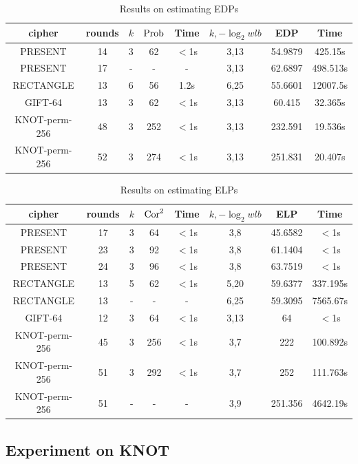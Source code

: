 \begin{table}
	\caption{Results on estimating EDPs}\label{tab:EDP}
	\centering
	\begin{tabular}{|c|c|c|c|c|c|c|c|}
		\hline
		cipher & rounds & $k$ & $\text{Prob}$ & Time & $k,-\log_2wlb$ & EDP & Time \\
		\hline
		PRESENT & 14 & 3 & 62 & $<$1s & 3,13 & 54.9879 & 425.15s \\
		\hline 
		PRESENT & 17 & - & - & - & 3,13 & 62.6897 & 498.513s\\
		\hline 
		RECTANGLE & 13 & 6 & 56 & 1.2s & 6,25 & 55.6601 & 12007.5s \\
		\hline
		GIFT-64 & 13 & 3 & 62 & $<$1s & 3,13 & 60.415 & 32.365s\\
		\hline
		KNOT-perm-256 & 48 & 3 & 252 & $<$1s & 3,13 & 232.591 & 19.536s\\
		\hline
		KNOT-perm-256 & 52 & 3 & 274 & $<$1s & 3,13 & 251.831 & 20.407s\\
		\hline
	\end{tabular}
\end{table}

\begin{table}
	\caption{Results on estimating ELPs}\label{tab:ELP}
	\centering
	\begin{tabular}{|c|c|c|c|c|c|c|c|}
		\hline
		cipher & rounds & $k$ & $\text{Cor}^2$ & Time & $k,-\log_2wlb$ & ELP & Time \\
		\hline
		PRESENT & 17 & 3 & 64 & $<$1s & 3,8 & 45.6582 & $<$1s\\
		\hline 
		PRESENT & 23 & 3 & 92 & $<$1s & 3,8 & 61.1404 & $<$1s\\
		\hline 
		PRESENT & 24 & 3 & 96 & $<$1s & 3,8 & 63.7519 & $<$1s\\
		\hline 
		RECTANGLE & 13 & 5 & 62 & $<$1s & 5,20 & 59.6377 & 337.195s \\
		\hline
		RECTANGLE & 13 & - & - & - & 6,25 & 59.3095 & 7565.67s \\
		\hline
		GIFT-64 & 12 & 3 & 64 & $<$1s& 3,13 & 64 & $<$1s \\
		\hline
		KNOT-perm-256 & 45 & 3 & 256 & $<$1s & 3,7 & 222 & 100.892s\\
		KNOT-perm-256 & 51 & 3 & 292 & $<$1s & 3,7 & 252 & 111.763s\\
		KNOT-perm-256 & 51 & - & - & - & 3,9 & 251.356 & 4642.19s\\
		\hline
	\end{tabular}
\end{table}

\subsection{Experiment on KNOT}

